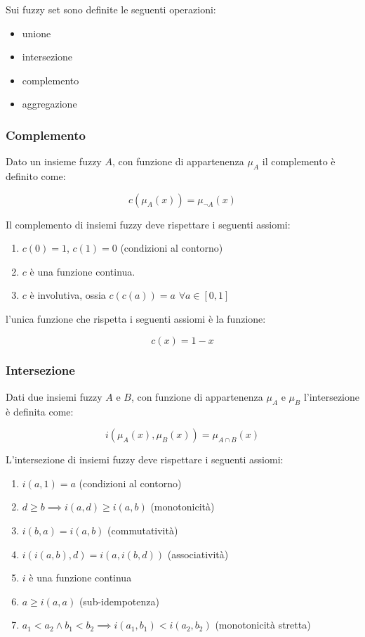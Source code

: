 Sui fuzzy set sono definite le seguenti operazioni:
\begin{itemize}
 \item unione
 \item intersezione
 \item complemento
 \item aggregazione
\end{itemize}

\subsubsection{Complemento}

Dato un insieme fuzzy $A$, con funzione di appartenenza $\mu_A$ il complemento è definito come:

\begin{equation*}
 c(\mu_A(x)) = \mu_{\neg A}(x)
\end{equation*}

Il complemento di insiemi fuzzy deve rispettare i seguenti assiomi:
\begin{enumerate}
 \item $c(0)=1$, $c(1)=0$ (condizioni al contorno)
 \item $c$ è una funzione continua.
 \item $c$ è involutiva, ossia $c(c(a))=a\, \, \forall a \in [0, 1]$
\end{enumerate}

l'unica funzione che rispetta i seguenti assiomi è la funzione:

\begin{equation*}
 c(x) = 1 - x
\end{equation*}

\subsubsection{Intersezione}

Dati due insiemi fuzzy $A$ e $B$, con funzione di appartenenza $\mu_A$ e $\mu_B$ l'intersezione  è definita come:

\begin{equation*}
 i(\mu_A(x), \mu_B(x)) = \mu_{A\cap B}(x)
\end{equation*}

L'intersezione di insiemi fuzzy deve rispettare i seguenti assiomi:

\begin{enumerate}
 \item $i(a, 1)=a$ (condizioni al contorno)
 \item $d\geq b \implies  i(a,d)\geq i(a,b)$ (monotonicità)
 \item $i(b,a) = i(a,b)$ (commutatività)
 \item $i(i(a,b),d)=i(a,i(b,d))$ (associatività)
 \item $i$ è una funzione continua
 \item $a\geq i(a,a)$ (sub-idempotenza)
 \item $a_1<a_2 \wedge b_1<b_2\implies i(a_1,b_1)<i(a_2,b_2)$ (monotonicità stretta)
\end{enumerate}

